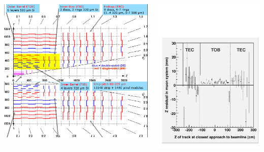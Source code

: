 \documentclass[compress]{beamer}
\begin{document}
\begin{frame}
\begin{columns}
\includegraphics[width=\linewidth]{tracker_map_innertop.png}

\includegraphics[width=\linewidth]{zresid_from_tracker_outertop.pdf}


\end{columns}
\end{frame}
\end{document}
